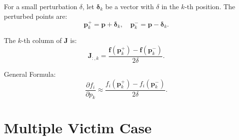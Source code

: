 For a small perturbation \( \delta \), let \( \boldsymbol{\delta}_k \) be a vector with \( \delta \) in the \( k \)-th position. The perturbed points are:
\[
\mathbf{p}^{+}_k = \mathbf{p} + \boldsymbol{\delta}_k, \quad \mathbf{p}^{-}_k = \mathbf{p} - \boldsymbol{\delta}_k.
\]

The \( k \)-th column of \( \mathbf{J} \) is:
\[
\mathbf{J}_{:, k} = \frac{\mathbf{f}(\mathbf{p}^{+}_k) - \mathbf{f}(\mathbf{p}^{-}_k)}{2 \delta}.
\]

General Formula:
\[
\frac{\partial f_i}{\partial p_k} \approx \frac{f_i(\mathbf{p}^{+}_k) - f_i(\mathbf{p}^{-}_k)}{2 \delta}.
\]


\section{Multiple Victim Case}
